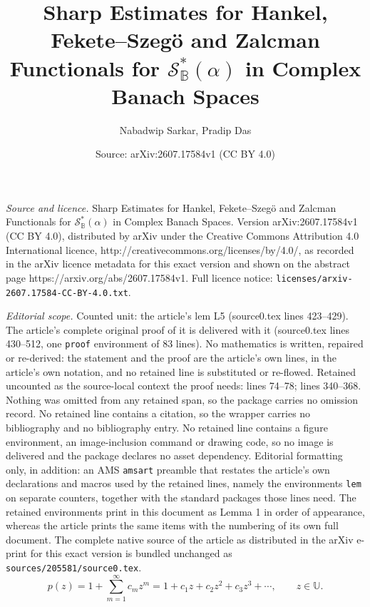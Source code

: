 \documentclass[10pt,a4paper]{amsart}
\title{Sharp Estimates for Hankel, Fekete--Szeg\"o and Zalcman Functionals for $\mathcal{S}_\mathbb{B}^{*}(\alpha)$ in Complex Banach Spaces}
\author{Nabadwip Sarkar, Pradip Das}
\date{Source: arXiv:2607.17584v1 (CC BY 4.0)}
\begin{document}
\maketitle

\noindent\emph{Source and licence.} Sharp Estimates for Hankel, Fekete--Szeg\"o and Zalcman Functionals for $\mathcal{S}_\mathbb{B}^{*}(\alpha)$ in Complex Banach Spaces. Version arXiv:2607.17584v1 (CC BY 4.0), distributed by arXiv under the Creative Commons Attribution 4.0 International licence, http://creativecommons.org/licenses/by/4.0/, as recorded in the arXiv licence metadata for this exact version and shown on the abstract page https://arxiv.org/abs/2607.17584v1. Full licence notice: \texttt{licenses/arxiv-2607.17584-CC-BY-4.0.txt}.\par\smallskip

\noindent\textit{Editorial scope.} Counted unit: the article's lem L5 (source0.tex lines 423--429). The article's complete original proof of it is delivered with it (source0.tex lines 430--512, one \texttt{proof} environment of 83 lines). No mathematics is written, repaired or re-derived: the statement and the proof are the article's own lines, in the article's own notation, and no retained line is substituted or re-flowed.  Retained uncounted as the source-local context the proof needs: lines 74--78; lines 340--368.  Nothing was omitted from any retained span, so the package carries no omission record.  No retained line contains a citation, so the wrapper carries no bibliography and no bibliography entry.  No retained line contains a figure environment, an image-inclusion command or drawing code, so no image is delivered and the package declares no asset dependency.  Editorial formatting only, in addition: an AMS \texttt{amsart} preamble that restates the article's own declarations and macros used by the retained lines, namely the environments \texttt{lem} on separate counters, together with the standard packages those lines need.  The retained environments print in this document as Lemma 1 in order of appearance, whereas the article prints the same items with the numbering of its own full document.  The complete native source of the article as distributed in the arXiv e-print for this exact version is bundled unchanged as \texttt{sources/205581/source0.tex}.
\begin{equation}\label{eq:P}
p(z)=1+\sum_{m=1}^{\infty}c_mz^m
=1+c_1z+c_2z^2+c_3z^3+\cdots,
\qquad z\in\mathbb{U}.
\end{equation}
\end{document}
